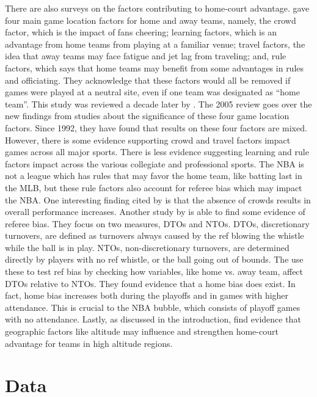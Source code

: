 \documentclass[10pt]{article}
\begin{document}
There are also surveys on the factors contributing to home-court advantage.
\citet{Carron1992} gave four main game location factors for home and away
teams, namely, the crowd factor, which is the impact of fans cheering; learning
factors, which is an advantage from home teams from playing at
a familiar venue; travel factors, the idea that away teams may face
fatigue and jet lag from traveling; and, rule factors, which says that home teams
may benefit from some advantages in rules and officiating. They acknowledge that
these factors would all be removed if games were played at a neutral site, even
if one team was designated as ``home team''. This study was reviewed a decade later
by \citet{Carron2005}. The 2005 review goes over the new findings from studies
about the significance of these four game location factors. Since 1992, they have found
that results on these four factors are mixed. However, there is some evidence
supporting crowd and travel factors impact games across all major sports. There is less
evidence suggesting learning and rule factors impact across the various collegiate 
and professional sports. The NBA is not a league which has rules that
may favor the home team, like batting last in the MLB, but these rule
factors also account for referee bias which may impact the NBA.  One
interesting finding cited by \citet{Carron2005} is that the absence of crowds results
in overall performance increases. Another study by \citet{Price} is able to find 
some evidence of referee bias. They focus on two measures, DTOs and NTOs. DTOs, 
discretionary turnovers, are defined as turnovers always caused by the ref blowing
the whistle while the ball is in play. NTOs, non-discretionary turnovers, are determined 
directly by players with no ref whistle, or the ball going out of bounds. The use
these to test ref bias by checking how variables, like home vs. away team, affect
DTOs relative to NTOs. They found evidence that a home bias does exist. In fact, home 
bias increases both during the playoffs and in games with higher attendance. This is
crucial to the NBA bubble, which consists of playoff games with no attendance. Lastly, 
as discussed in the introduction, \citet{Lopez}
find evidence that geographic factors like altitude may influence and strengthen home-court
advantage for teams in high altitude regions.

\section{Data}
\end{document}
